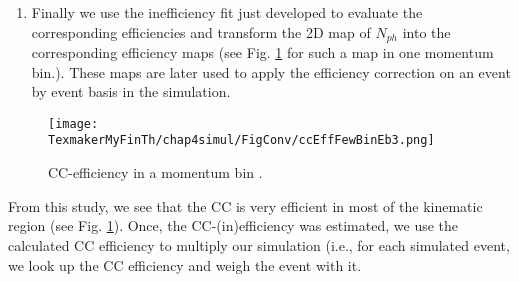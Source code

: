 \begin{enumerate}
\item Finally we use the inefficiency fit just developed to evaluate the corresponding efficiencies and transform the 2D map of $N_{ph}$  into the corresponding efficiency maps (see Fig. \ref{ccEffMapEb3} for such a map in one momentum bin.). These maps are later used to apply the efficiency correction on an event by event basis in the simulation.
\end{enumerate}



\begin{figure}[H] %
  \leavevmode \texttt{[image: TexmakerMyFinTh/chap4simul/FigConv/ccEffFewBinEb3.png]} 
  \caption[CC-efficiency as a 2D map]{CC-efficiency in a momentum bin .}
  \label{ccEffMapEb3}
\end{figure}


From this study, we see that the CC is very efficient in most of the kinematic region (see Fig. \ref{ccEffMapEb3}).
Once, the CC-(in)efficiency was estimated, we use the calculated CC efficiency to multiply our simulation (i.e., for each simulated event, we look up the CC efficiency and weigh the event with it. %









